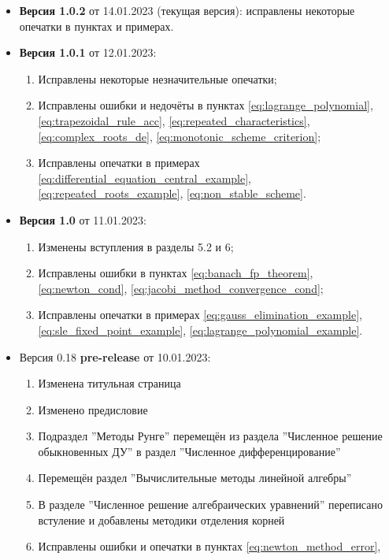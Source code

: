 \documentclass{article}
\begin{document}

\begin{itemize}[nosep]
\item \textbf{Версия 1.0.2} от 14.01.2023 (текущая версия): исправлены некоторые
	опечатки в пунктах и примерах.
\item \textbf{Версия 1.0.1} от 12.01.2023:
	\begin{enumerate}[nosep]
		\item Исправлены некоторые незначительные опечатки;
		\item Исправлены ошибки и недочёты в пунктах
			\eqref{eq:lagrange_polynomial},
			\eqref{eq:trapezoidal_rule_acc},
			\eqref{eq:repeated_characteristics},
			\eqref{eq:complex_roots_de},
			\eqref{eq:monotonic_scheme_criterion};
		\item Исправлены опечатки в примерах
			\eqref{eq:differential_equation_central_example},
			\eqref{eq:repeated_roots_example},
			\eqref{eq:non_stable_scheme}.
	\end{enumerate}
\item \textbf{Версия 1.0} от 11.01.2023:
	\begin{enumerate}[nosep]
		\item Изменены вступления в разделы 5.2 и 6;
		\item Исправлены ошибки в пунктах
			\eqref{eq:banach_fp_theorem},
			\eqref{eq:newton_cond},
			\eqref{eq:jacobi_method_convergence_cond};
		\item Исправлены опечатки в примерах
			\eqref{eq:gauss_elimination_example},
			\eqref{eq:sle_fixed_point_example},
			\eqref{eq:lagrange_polynomial_example}.
	\end{enumerate}
\item Версия 0.18 \textbf{pre-release} от 10.01.2023:
	\begin{enumerate}[nosep]
		\item Изменена титульная страница
		\item Изменено предисловие
		\item Подраздел ''Методы Рунге'' перемещён из раздела
			''Численное решение обыкновенных ДУ'' в раздел
			''Численное дифференцирование''
		\item Перемещён раздел ''Вычислительные методы линейной
			алгебры''
		\item В разделе ''Численное решение алгебраических уравнений''
			переписано встуление и добавлены методики отделения
			корней
		\item Исправлены ошибки и опечатки в пунктах
			\eqref{eq:newton_method_error},

\end{enumerate}
\end{itemize}
\end{document}
